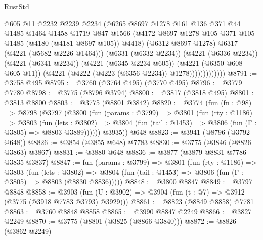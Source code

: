 \begin{lexlean}{RustStd}
\begin{coremodule}
                          @605
                          @11
                          @2232
                          @2239
                          @2234
                          (@6265
                            @8697
                            @1278
                            @161
                            @136
                            @371
                            @44
                            @1485
                            @1464
                            @1458
                            @1719
                            @847
                            @1566
                            (@4172
                              @8697
                              @1278
                              @105
                              @371
                              @105
                              @1485
                              (@4180 (@4181 @8697 @105))
                              @4418)
                            (@6312 @8697 @1278)
                            @6317
                            (@4221 (@5682 @2226 @1464)))
                          (@6331 (@6332 @2234))
                          (@4221 (@6336 @2234))
                          (@4221 (@6341 @2234))
                          (@4221 (@6345 @2234 @605))
                          (@4221 (@6350 @608 @605 @11))
                          (@4221 (@4222 (@4223 (@6356 @2234)) @1278)))))))))))))
@8791 := @3758 @495
@8795 := @3760 (@3764 @495) (@3770 @495)
@8796 := @3779 @7780
@8798 := @3775 (@8796 @3794)
@8800 := @3817 (@3818 @495)
@8801 := @3813 @8800
@8803 := @3775 (@8801 @3842)
@8820 := @3774
    (fun (fn : @98) =>
    @8798
      (@3797
        (@3800
          (fun (params : @3799) =>
          @3801
            (fun (rty : @1186) =>
            @3803
              (fun (lets : @3802) =>
              @3804 (fun (tail : @1453) => @3806 (fun (Γ : @3805) => @8803 @3889))))))
        @3935))
    @648
@8823 := @3941 (@8796 (@3792 @648))
@8826 := @3854 (@3855 @648) @7783
@8830 := @3775 (@3846 (@8826 @3863) @3867)
@8831 := @3880 @648
@8836 := @3877 (@3879 @8831 @7786 @3835 @3837)
@8847 := fun (params : @3799) =>
  @3801
    (fun (rty : @1186) =>
    @3803
      (fun (lets : @3802) =>
      @3804 (fun (tail : @1453) => @3806 (fun (Γ : @3805) => @8803 (@8830 @8836)))))
@8848 := @3800 @8847
@8849 := @3797 @8848
@8858 := @3903 (fun (U : @3902) => @3904 (fun (t : @7) => @3912 (@3775 (@3918 @7783 @3793) @3929)))
@8861 := @8823 (@8849 @8858) @7781
@8863 := @3760 @8848 @8858
@8865 := @3990 @8847 @2249
@8866 := @3827 @2249
@8870 := @3775 (@8801 (@3825 (@8866 @3840)))
@8872 := @8826 (@3862 @2249)

\end{coremodule}
\end{lexlean}
